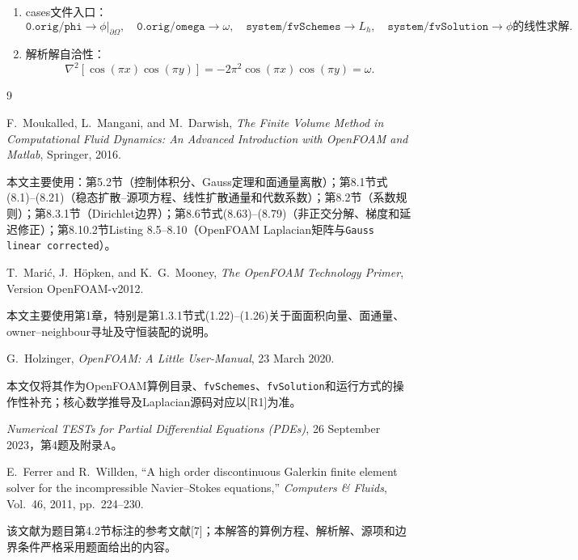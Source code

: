 \documentclass[UTF8,12pt,a4paper]{ctexart}
\numberwithin{equation}{section}
\newcommand{\Rone}{\textnormal{[R1]}}
\begin{document}
\begin{enumerate}
  \item cases文件入口：
  \begin{equation*}
    \boxed{
    \texttt{0.orig/phi}\to \phi|_{\partial\Omega},
    \quad
    \texttt{0.orig/omega}\to \omega,
    \quad
    \texttt{system/fvSchemes}\to L_h,
    \quad
    \texttt{system/fvSolution}\to \phi\text{的线性求解}.}
  \end{equation*}

  \item 解析解自洽性：
  \begin{equation*}
    \boxed{
    \nabla^2[\cos(\pi x)\cos(\pi y)]
    =-2\pi^2\cos(\pi x)\cos(\pi y)=\omega.}
  \end{equation*}
\end{enumerate}


\begin{thebibliography}{9}

F.~Moukalled, L.~Mangani, and M.~Darwish,
\textit{The Finite Volume Method in Computational Fluid Dynamics: An Advanced Introduction with OpenFOAM and Matlab},
Springer, 2016.

本文主要使用：第5.2节（控制体积分、Gauss定理和面通量离散）；第8.1节式(8.1)--(8.21)（稳态扩散--源项方程、线性扩散通量和代数系数）；第8.2节（系数规则）；第8.3.1节（Dirichlet边界）；第8.6节式(8.63)--(8.79)（非正交分解、梯度和延迟修正）；第8.10.2节Listing 8.5--8.10（OpenFOAM Laplacian矩阵与\texttt{Gauss linear corrected}）。

T.~Mari\'{c}, J.~H\"opken, and K.~G.~Mooney,
\textit{The OpenFOAM Technology Primer},
Version OpenFOAM-v2012.

本文主要使用第1章，特别是第1.3.1节式(1.22)--(1.26)关于面面积向量、面通量、owner--neighbour寻址及守恒装配的说明。

G.~Holzinger,
\textit{OpenFOAM: A Little User-Manual},
23 March 2020.

本文仅将其作为OpenFOAM算例目录、\texttt{fvSchemes}、\texttt{fvSolution}和运行方式的操作性补充；核心数学推导及Laplacian源码对应以\Rone 为准。

\textit{Numerical TESTs for Partial Differential Equations (PDEs)},
26 September 2023，第4题及附录A。

E.~Ferrer and R.~Willden,
``A high order discontinuous Galerkin finite element solver for the incompressible Navier--Stokes equations,''
\textit{Computers \& Fluids}, Vol.~46, 2011, pp.~224--230.

该文献为题目第4.2节标注的参考文献[7]；本解答的算例方程、解析解、源项和边界条件严格采用题面给出的内容。

\end{thebibliography}
\end{document}
